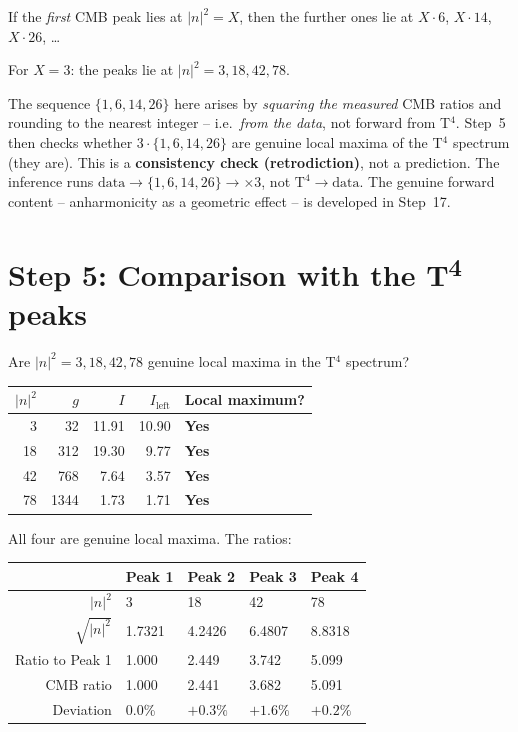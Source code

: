 If the \emph{first} CMB peak lies at $|n|^2 = X$, then the
further ones lie at $X \cdot 6$, $X \cdot 14$, $X \cdot 26$, \ldots

For $X = 3$: the peaks lie at $|n|^2 = 3, 18, 42, 78$.

\begin{tcolorbox}[colback=red!4!white, colframe=red!55!black,
  title={Honest reading of Step~4 (direction of inference)}]
The sequence $\{1,6,14,26\}$ here arises by \emph{squaring the measured} CMB
ratios and rounding to the nearest integer -- i.e.\ \emph{from the data}, not
forward from T$^4$. Step~5 then checks whether $3\cdot\{1,6,14,26\}$ are
genuine local maxima of the T$^4$ spectrum (they are). This is a
\textbf{consistency check (retrodiction)}, not a prediction. The inference
runs $\text{data}\to\{1,6,14,26\}\to{\times3}$, not $\text{T}^4\to\text{data}$.
The genuine forward content -- anharmonicity as a geometric effect -- is
developed in Step~17.
\end{tcolorbox}

\section{Step 5: Comparison with the T\textsuperscript{4} peaks}

Are $|n|^2 = 3, 18, 42, 78$ genuine local maxima in the T$^4$ spectrum?

\begin{center}
\begin{tabular}{rrrrl}
\toprule
$|n|^2$ & $g$ & $I$ & $I_\mathrm{left}$ & Local maximum? \\
\midrule
3  & 32   & 11{.}91 & 10{.}90 & \textbf{Yes} \\
18 & 312  & 19{.}30 & 9{.}77  & \textbf{Yes} \\
42 & 768  & 7{.}64  & 3{.}57  & \textbf{Yes} \\
78 & 1344 & 1{.}73  & 1{.}71  & \textbf{Yes} \\
\bottomrule
\end{tabular}
\end{center}

All four are genuine local maxima. The ratios:

\begin{center}
\begin{tabular}{rllll}
\toprule
 & Peak 1 & Peak 2 & Peak 3 & Peak 4 \\
\midrule
$|n|^2$ & 3 & 18 & 42 & 78 \\
$\sqrt{|n|^2}$ & 1{.}7321 & 4{.}2426 & 6{.}4807 & 8{.}8318 \\
Ratio to Peak 1 & 1{.}000 & 2{.}449 & 3{.}742 & 5{.}099 \\
CMB ratio & 1{.}000 & 2{.}441 & 3{.}682 & 5{.}091 \\
Deviation & 0{.}0\% & $+0{.}3\%$ & $+1{.}6\%$ & $+0{.}2\%$ \\
\bottomrule
\end{tabular}
\end{center}

